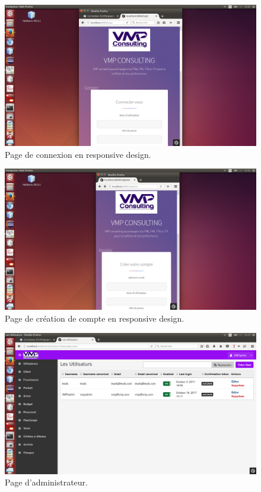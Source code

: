 \documentclass[12pt]{article}
\begin{document}
\begin{figure}[htp]
  \centering
  \includegraphics[width=12cm]{t4.png}
  \caption{Page de connexion en responsive design.}
  \label{fig:une-autre-image}
\end{figure}

\begin{figure}[htp]
  \centering
  \includegraphics[width=12cm]{t5.png}
  \caption{Page de création de compte en responsive design.}
  \label{fig:une-autre-image}
\end{figure}

\begin{figure}[htp]
  \centering
  \includegraphics[width=12cm]{t7.png}
  \caption{Page d'administrateur.}
  \label{fig:une-autre-image}
\end{figure}
\end{document}
